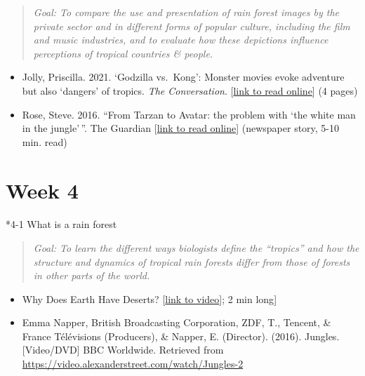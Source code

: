 \documentclass[
  10pt,
  letterpaper,
  oneside,
  open=any]{scrbook}
\makeatletter
\let\oldparagraph\paragraph
\renewcommand{\paragraph}{
    \@ifstar
      \xxxParagraphStar
      \xxxParagraphNoStar
  }
\newcommand{\xxxParagraphStar}[1]{\oldparagraph*{#1}\mbox{}}
\newcommand{\xxxParagraphNoStar}[1]{\oldparagraph{#1}\mbox{}}
\makeatother
\begin{document}
\begin{quote}
\emph{Goal: To compare the use and presentation of rain forest images by
the private sector and in different forms of popular culture, including
the film and music industries, and to evaluate how these depictions
influence perceptions of tropical countries \& people.}
\end{quote}

\begin{itemize}
\item
  Jolly, Priscilla. 2021. `Godzilla vs.~Kong': Monster movies evoke
  adventure but also `dangers' of tropics. \emph{The Conversation}.
  {[}\href{https://theconversation.com/godzilla-vs-kong-monster-movies-evoke-adventure-but-also-dangers-of-tropics-158105}{link
  to read online}{]} (4 pages)
\item
  Rose, Steve. 2016. ``From Tarzan to Avatar: the problem with `the
  white man in the jungle'\,''. The Guardian
  {[}\href{https://www.theguardian.com/film/2016/jul/06/why-the-white-man-in-the-jungle-film-wont-die}{link
  to read online}{]} (newspaper story, 5-10 min. read)
\end{itemize}

\section*{Week 4}\label{week-4}


\paragraph*{4-1 What is a rain forest}\label{what-is-a-rain-forest}

\begin{quote}
\emph{Goal: To learn the different ways biologists define the
``tropics'' and how the structure and dynamics of tropical rain forests
differ from those of forests in other parts of the world.}
\end{quote}

\begin{itemize}
\item
  Why Does Earth Have Deserts?
  {[}\href{https://www.youtube.com/watch?v=T6Us1sPXBfA}{link to
  video}{]}; 2 min long{]}
\item
  Emma Napper, British Broadcasting Corporation, ZDF, T., Tencent, \&
  France Télévisions (Producers), \& Napper, E. (Director). (2016).
  Jungles. {[}Video/DVD{]} BBC Worldwide. Retrieved from
  \url{https://video.alexanderstreet.com/watch/Jungles-2}
\end{itemize}
\end{document}

